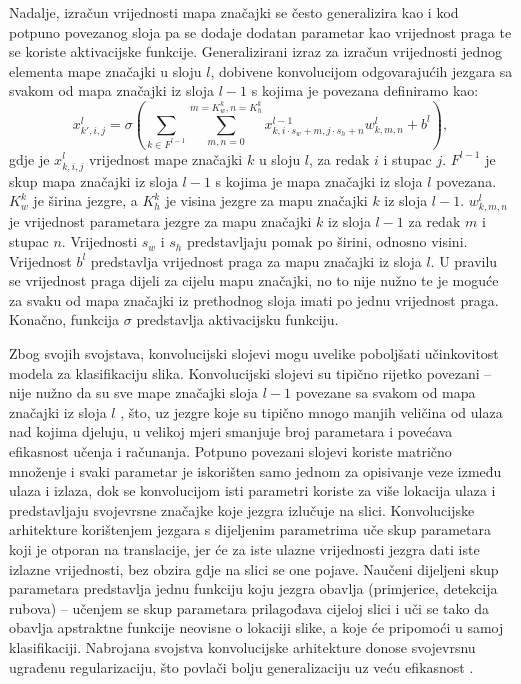 \documentclass[times, utf8, diplomski, numeric]{fer}
\begin{document}
Nadalje, izračun vrijednosti mapa značajki se često generalizira kao i kod potpuno povezanog sloja pa se dodaje dodatan parametar kao vrijednost praga te se koriste aktivacijske funkcije.
Generalizirani izraz za izračun vrijednosti jednog elementa mape značajki u sloju $l$, dobivene konvolucijom odgovarajućih jezgara sa svakom od mapa značajki iz sloja $l-1$ s kojima je povezana definiramo kao:
\begin{equation}
 x^l_{k',i,j}=\sigma\left(\sum_{k\in F^{l-1}}\sum_{m,n=0}^{m=K_w^k,n=K_h^k}x^{l-1}_{k, i \cdot s_w +m, j \cdot s_h +n} w^l_{k, m, n} + b^l\right), \label{eq:generalized_convolution}
\end{equation}
gdje je $x_{k,i,j}^l$ vrijednost mape značajki $k$ u sloju $l$, za redak $i$ i stupac $j$. 
$F^{l-1}$ je skup mapa značajki iz sloja $l-1$ s kojima je mapa značajki iz sloja $l$ povezana. 
$K_w^k$ je širina jezgre, a $K_h^k$ je visina jezgre za mapu značajki $k$ iz sloja $l-1$. 
$w^l_{k, m, n}$ je vrijednost parametara jezgre za mapu značajki $k$ iz sloja $l-1$ za redak $m$ i stupac $n$.
Vrijednosti $s_w$ i $s_h$ predstavljaju pomak po širini, odnosno visini.
Vrijednost $b^l$ predstavlja vrijednost praga za mapu značajki iz sloja $l$. 
U pravilu se vrijednost praga dijeli za cijelu mapu značajki, no to nije nužno te je moguće za svaku od mapa značajki iz prethodnog sloja imati po jednu vrijednost praga.
Konačno, funkcija $\sigma$ predstavlja aktivacijsku funkciju.

Zbog svojih svojstava, konvolucijski slojevi mogu uvelike poboljšati učinkovitost modela za klasifikaciju slika.
Konvolucijski slojevi su tipično rijetko povezani -- nije nužno da su sve mape značajki sloja $l-1$ povezane sa svakom od mapa značajki iz sloja $l$ \citep{book:deeplearningbook}, što, uz jezgre koje su tipično mnogo manjih veličina od ulaza nad kojima djeluju, u velikoj mjeri smanjuje broj parametara i povećava efikasnost učenja i računanja.
Potpuno povezani slojevi koriste matrično množenje i svaki parametar je iskorišten samo jednom za opisivanje veze između ulaza i izlaza, dok se konvolucijom isti parametri koriste za više lokacija ulaza i predstavljaju svojevrsne značajke koje jezgra izlučuje na slici.
Konvolucijske arhitekture korištenjem jezgara s dijeljenim parametrima uče skup parametara koji je otporan na translacije, jer će za iste ulazne vrijednosti jezgra dati iste izlazne vrijednosti, bez obzira gdje na slici se one pojave. 
Naučeni dijeljeni skup parametara predstavlja jednu funkciju koju jezgra obavlja (primjerice, detekcija rubova) -- učenjem se skup parametara prilagođava cijeloj slici i uči se tako da obavlja apstraktne funkcije neovisne o lokaciji slike, a koje će pripomoći u samoj klasifikaciji.
Nabrojana svojstva konvolucijske arhitekture donose svojevrsnu ugrađenu regularizaciju, što povlači bolju generalizaciju uz veću efikasnost \citep{book:deeplearningbook} \citep{masters:vukotic_ms} \citep{seminar:rela}.
\end{document}
